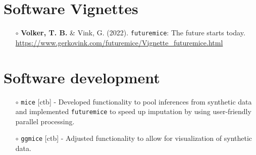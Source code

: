 \documentclass[11pt,a4paper,roman,colorlinks,linkcolor = blue]{moderncv}        %
\begin{document}
\section{Software Vignettes}

\begin{itemize}
\item[$\circ$] \textbf{Volker, T. B.} \& Vink, G. (2022). \texttt{futuremice}: The future starts today. \url{https://www.gerkovink.com/futuremice/Vignette_futuremice.html}
\end{itemize}

\section{Software development}

\begin{itemize}

\item[$\circ$] \texttt{mice} [ctb] - Developed functionality to pool inferences from synthetic data and implemented \texttt{futuremice} to speed up imputation by using user-friendly parallel processing.
\item[$\circ$] \texttt{ggmice} [ctb] - Adjusted functionality to allow for visualization of synthetic data.
  \end{itemize}


\end{document}
